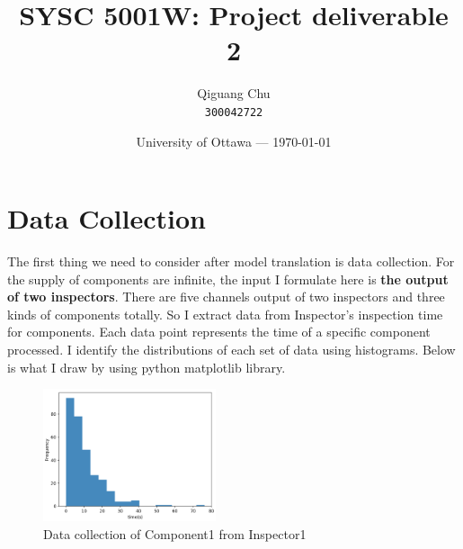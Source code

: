 \documentclass{article}
\title{SYSC 5001W: Project deliverable 2} %
\author{Qiguang Chu\\ \texttt{300042722}} %
\date{University of Ottawa --- \today} %
\begin{document}
\maketitle

\section{Data Collection}

The first thing we need to consider after model translation is data collection. For the supply of components are infinite,  the input I formulate here is \textbf{the output of two inspectors}. There are five channels output of two inspectors and three kinds of components totally. So I extract data from Inspector's inspection time for components. Each data point represents the time of a specific component processed. I identify the distributions of each set of data using histograms. Below is what I draw by using python matplotlib library.


\begin{figure}[htbp]
\begin{center}
\includegraphics[width=2in]{dataCollection1.png}
\caption{Data collection of Component1 from Inspector1}
\label{data1}
\end{center}
\end{figure}
\end{document}
